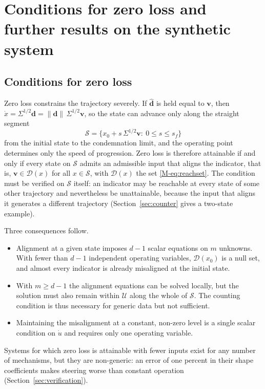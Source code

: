 \documentclass[12pt]{article}
\newcommand{\dvec}{\mathbf{d}}
\newcommand{\dhat}{\hat{\mathbf{d}}}
\begin{document}
\section{Conditions for zero loss and further results on the synthetic system}
\label{sec:further}

\subsection{Conditions for zero loss}
\label{sec:zero}

Zero loss constrains the trajectory severely. If $\dhat$ is held equal to
$\mathbf v$, then $\dot x=\Sigma^{1/2}\dvec=\|\dvec\|\,\Sigma^{1/2}\mathbf v$,
so the state can advance only along the straight segment
\begin{equation}
\mathcal S=\{x_0+s\,\Sigma^{1/2}\mathbf v:\ 0\le s\le s_f\}
\label{eq:segment}
\end{equation}
from the initial state to the condemnation limit, and the operating point
determines only the speed of progression. Zero loss is therefore attainable
if and only if every state on $\mathcal S$ admits an admissible input that
aligns the indicator, that is, $\mathbf v\in\mathcal D(x)$ for all
$x\in\mathcal S$, with $\mathcal D(x)$ the set \eqref{M-eq:reachset}. The
condition must be verified on $\mathcal S$ itself: an indicator may be
reachable at every state of some other trajectory and nevertheless be
unattainable, because the input that aligns it generates a different
trajectory (Section~\ref{sec:counter} gives a two-state example).

Three consequences follow.
\begin{itemize}
\item Alignment at a given state imposes $d-1$ scalar equations on $m$
unknowns. With fewer than $d-1$ independent operating variables,
$\mathcal D(x_0)$ is a null set, and almost every indicator is already
misaligned at the initial state.
\item With $m\ge d-1$ the alignment equations can be solved locally, but the
solution must also remain within $\mathcal U$ along the whole of
$\mathcal S$. The counting condition is thus necessary for generic data but
not sufficient.
\item Maintaining the misalignment at a constant, non-zero level is a single
scalar condition on $\dot u$ and requires only one operating variable.
\end{itemize}
Systems for which zero loss is attainable with fewer inputs exist for any
number of mechanisms, but they are non-generic: an error of one percent in
their shape coefficients makes steering worse than constant operation
(Section~\ref{sec:verification}).
\end{document}
